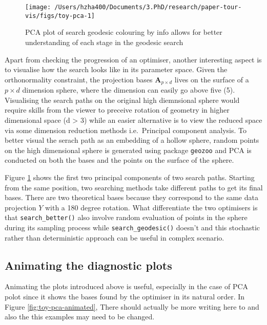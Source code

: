\documentclass[12pt]{article}
\begin{document}
\begin{figure}

{\centering \texttt{[image: /Users/hzha400/Documents/3.PhD/research/paper-tour-vis/figs/toy-pca-1]} 

}

\caption{PCA plot of search geodesic colouring by info allows for better understanding of each stage in the geodesic search}\label{fig:toy-pca}
\end{figure}



Apart from checking the progression of an optimiser, another interesting aspect is to visualise how the search looks like in its parameter space. Given the orthonormality constraint, the projection bases \(\mathbf{A}_{p \times d}\) lives on the surface of a \(p \times d\) dimension sphere, where the dimension can easily go above five (5). Visualising the search paths on the original high diemnsional sphere would require skills from the viewer to preceive rotation of geometry in higher dimensional space (d \textgreater{} 3) while an easier alternative is to view the reduced space via some dimension reduction methods i.e.~Principal component analysis. To better visual the serach path as an embedding of a hollow sphere, random points on the high dimensional sphere is generated using package \texttt{geozoo} and PCA is conducted on both the bases and the points on the surface of the sphere.

Figure \ref{fig:toy-pca} shows the first two principal components of two search paths. Starting from the same position, two searching methods take different paths to get its final bases. There are two theoretical bases because they correspond to the same data projection \(Y\) with a 180 degree rotation. What differentiate the two optimisers is that \texttt{search\_better()} also involve random evaluation of points in the sphere during its sampling process while \texttt{search\_geodesic()} doesn't and this stochastic rather than deterministic approach can be useful in complex scenario.

\hypertarget{animating-the-diagnostic-plots}{%
\subsection{Animating the diagnostic plots}\label{animating-the-diagnostic-plots}}



Animating the plots introduced above is useful, especially in the case of PCA polot since it shows the bases found by the optimiser in its natural order. In Figure \ref{fig:toy-pca-animated}, There should actually be more writing here to and also the this examples may need to be changed.
\end{document}
